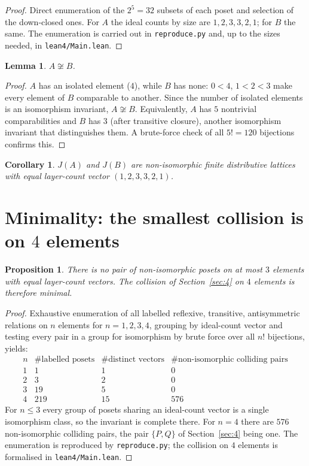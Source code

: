 \documentclass[11pt]{article}
\newtheorem{proposition}[definition]{Proposition}
\newtheorem{lemma}[definition]{Lemma}
\newtheorem{corollary}[definition]{Corollary}
\theoremstyle{remark}
\begin{document}
\begin{proof}
Direct enumeration of the $2^5 = 32$ subsets of each poset and selection of the
down-closed ones.  For $A$ the ideal counts by size are $1,2,3,3,2,1$; for $B$ the
same.  The enumeration is carried out in \texttt{reproduce.py} and, up to the
sizes needed, in \texttt{lean4/Main.lean}.
\end{proof}

\begin{lemma}
\label{lem:noniso5}
$A \not\cong B$.
\end{lemma}

\begin{proof}
$A$ has an isolated element ($4$), while $B$ has none: $0<4$, $1<2<3$ make every
element of $B$ comparable to another.  Since the number of isolated elements is
an isomorphism invariant, $A \not\cong B$.  Equivalently, $A$ has $5$ nontrivial
comparabilities and $B$ has $3$ (after transitive closure), another isomorphism
invariant that distinguishes them.  A brute-force check of all $5! = 120$
bijections confirms this.
\end{proof}

\begin{corollary}
$J(A)$ and $J(B)$ are non-isomorphic finite distributive lattices with equal
layer-count vector $(1,2,3,3,2,1)$.
\end{corollary}

\section{Minimality: the smallest collision is on $4$ elements}

\begin{proposition}
\label{prop:minimal}
There is no pair of non-isomorphic posets on at most $3$ elements with equal
layer-count vectors.  The collision of Section~\ref{sec:4} on $4$ elements is
therefore minimal.
\end{proposition}

\begin{proof}
Exhaustive enumeration of all labelled reflexive, transitive, antisymmetric
relations on $n$ elements for $n = 1,2,3,4$, grouping by ideal-count vector and
testing every pair in a group for isomorphism by brute force over all $n!$
bijections, yields:
\[
\begin{array}{c|c|c|c}
n & \#\text{labelled posets} & \#\text{distinct vectors} & \#\text{non-isomorphic colliding pairs}\\ \hline
1 & 1   & 1  & 0 \\
2 & 3   & 2  & 0 \\
3 & 19  & 5  & 0 \\
4 & 219 & 15 & 576
\end{array}
\]
For $n \le 3$ every group of posets sharing an ideal-count vector is a single
isomorphism class, so the invariant is complete there.  For $n = 4$ there are
$576$ non-isomorphic colliding pairs, the pair $\{P,Q\}$ of Section~\ref{sec:4}
being one.  The enumeration is reproduced by \texttt{reproduce.py};
the collision on $4$ elements is formalised in \texttt{lean4/Main.lean}.
\end{proof}
\end{document}
